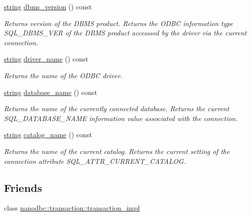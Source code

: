 \begin{DoxyCompactItemize}
\mbox{\hyperlink{namespacenanodbc_abfc0ece56278e590911ec8352774c212}{string}} \mbox{\hyperlink{classnanodbc_1_1connection_ad1d7d8901d376a3d451a49220e2c2b3c}{dbms\+\_\+version}} () const
\begin{DoxyCompactList}\small\item\em Returns version of the D\+B\+MS product. Returns the O\+D\+BC information type S\+Q\+L\+\_\+\+D\+B\+M\+S\+\_\+\+V\+ER of the D\+B\+MS product accesssed by the driver via the current connection. \end{DoxyCompactList}\item 
\mbox{\hyperlink{namespacenanodbc_abfc0ece56278e590911ec8352774c212}{string}} \mbox{\hyperlink{classnanodbc_1_1connection_a9a93b35bd875edefa81c39c14ecc282f}{driver\+\_\+name}} () const
\begin{DoxyCompactList}\small\item\em Returns the name of the O\+D\+BC driver. \end{DoxyCompactList}\item 
\mbox{\hyperlink{namespacenanodbc_abfc0ece56278e590911ec8352774c212}{string}} \mbox{\hyperlink{classnanodbc_1_1connection_af6cc1d8f8eaa9cd2ac9f215020f75dec}{database\+\_\+name}} () const
\begin{DoxyCompactList}\small\item\em Returns the name of the currently connected database. Returns the current S\+Q\+L\+\_\+\+D\+A\+T\+A\+B\+A\+S\+E\+\_\+\+N\+A\+ME information value associated with the connection. \end{DoxyCompactList}\item 
\mbox{\hyperlink{namespacenanodbc_abfc0ece56278e590911ec8352774c212}{string}} \mbox{\hyperlink{classnanodbc_1_1connection_a2fd48ede244a5a3d8c640e738073e322}{catalog\+\_\+name}} () const
\begin{DoxyCompactList}\small\item\em Returns the name of the current catalog. Returns the current setting of the connection attribute S\+Q\+L\+\_\+\+A\+T\+T\+R\+\_\+\+C\+U\+R\+R\+E\+N\+T\+\_\+\+C\+A\+T\+A\+L\+OG. \end{DoxyCompactList}\end{DoxyCompactItemize}
\subsection*{Friends}
\begin{DoxyCompactItemize}
\item 
class \mbox{\hyperlink{classnanodbc_1_1connection_a81c6edeae265bb1c87fcb10a9a73da73}{nanodbc\+::transaction\+::transaction\+\_\+impl}}
\end{DoxyCompactItemize}


